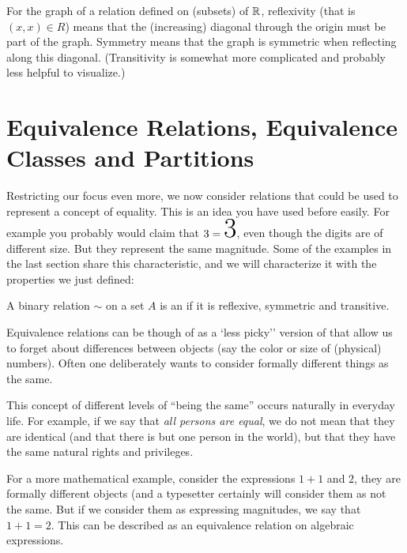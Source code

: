 For the graph of a relation defined on (subsets) of ${\mathbb R}$, reflexivity (that is $(x,x)\in
R$) means that the (increasing) diagonal through the origin must be part of the graph.
Symmetry means that the graph is symmetric when reflecting along this diagonal.
(Transitivity is somewhat more complicated and probably less helpful to visualize.)

\section{Equivalence Relations, Equivalence Classes and Partitions}

Restricting our focus even more,
we now consider relations that could be used to represent a concept of
equality. This is an idea
you have used before easily. For example you probably would
claim that $3=\mbox{\Huge 3}$, even though the digits are of different
size. But they represent the same magnitude. Some of the examples in the
last section share this characteristic, and we will characterize it with the
properties we just defined:
\begin{defn}
A binary relation $\sim$ on a set $A$ is an  if
it is reflexive, symmetric and transitive.
\end{defn}
Equivalence relations can be though of as a `less picky'' version of
 that allow us to forget about differences between objects (say the
color or size  of (physical) numbers). Often one deliberately wants to
consider formally different things as the same. 

This concept of different levels of ``being the same'' occurs naturally in
everyday life. For example, if we say that {\em all persons are equal}, we do not
mean that they are identical (and that there is but one person in the world), but
that they have the same natural rights and privileges.

For a more mathematical example, consider the expressions $1+1$ and $2$, they are formally
different objects (and a typesetter certainly will consider them as not
the same. But if we consider them as expressing magnitudes, we say that
$1+1=2$.
This can be described as an equivalence relation on algebraic expressions.
\medskip

